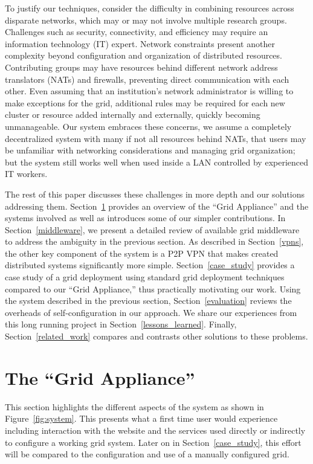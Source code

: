 \documentclass[conference]{IEEEtran}
\begin{document}
To justify our techniques, consider the difficulty in combining resources
across disparate networks, which may or may not involve multiple research
groups.  Challenges such as security, connectivity, and efficiency may require
an information technology (IT) expert.  Network constraints present another
complexity beyond configuration and organization of distributed resources.
Contributing groups may have resources behind different network address
translators (NATs) and firewalls, preventing direct communication with each
other.  Even assuming that an institution's network administrator is willing to
make exceptions for the grid, additional rules may be required for each new
cluster or resource added internally and externally, quickly becoming
unmanageable.  Our system embraces these concerns, we assume a completely
decentralized system with many if not all resources behind NATs, that users may
be unfamiliar with networking considerations and managing grid organization;
but the system still works well when used inside a LAN controlled by
experienced IT workers.

The rest of this paper discusses these challenges in more depth and our
solutions addressing them.  Section~\ref{system} provides an overview of the
``Grid Appliance'' and the systems involved as well as introduces some of our
simpler contributions.  In Section~\ref{middleware}, we present a detailed
review of available grid middleware to address the ambiguity in the previous
section.  As described in Section~\ref{vpns}, the other key component of the
system is a P2P VPN that makes created distributed systems significantly more
simple.  Section~\ref{case_study} provides a case study of a grid deployment
using standard grid deployment techniques compared to our ``Grid Appliance,''
thus practically motivating our work.  Using the system described in the
previous section, Section~\ref{evaluation} reviews the overheads of
self-configuration in our approach.  We share our experiences from this long
running project in Section~\ref{lessons_learned}.  Finally,
Section~\ref{related_work} compares and contrasts other solutions to these
problems.

\section{The ``Grid Appliance''}
\label{system}

This section highlights the different aspects of the system as shown in
Figure~\ref{fig:system}.  This presents what a first time user would experience
including interaction with the website and the services used directly or
indirectly to configure a working grid system.  Later on in
Section~\ref{case_study}, this effort will be compared to the configuration and
use of a manually configured grid.
\end{document}
